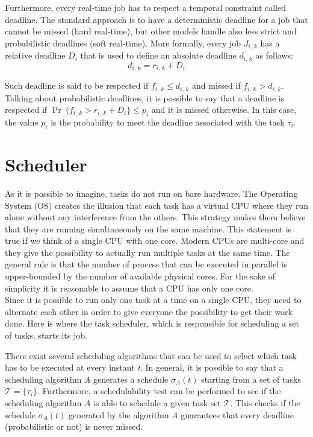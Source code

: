 Furthermore, every real-time job has to respect a temporal constraint called
deadline. The standard approach is to have a deterministic deadline for a job
that cannot be missed (hard real-time), but other models handle also
less strict and probabilistic deadlines (soft real-time).
More formally, every job \( J_{i,\,k} \) has a relative deadline \( D_{i} \) that
is used to define an absolute deadline \( d_{i,\,k} \) as follows:
\begin{equation}
    d_{i,\,k} = r_{i,\,k} + D_{i}
\end{equation}

Such deadline is said to be respected if \( f_{i,\,k} \leq d_{i,\,k} \) and missed
if \( f_{i,\,k} > d_{i,\,k} \). Talking about probabilistic deadlines, it is
possible to say that a deadline is respected if 
\( \Pr\,\{f_{i,\,k} > r_{i,\,k} + D_{i} \} \leq p_{i} \) and it is missed otherwise.
In this case, the value \( p_{i} \) is the probability to meet the deadline associated
with the task \( \tau_{i} \).

\section{Scheduler} \label{sec:scheduler}
As it is possible to imagine, tasks do not run on bare hardware.
The Operating System (OS) creates the illusion that each task has a virtual CPU
where they run alone without any interference from the others.
This strategy makes them believe that they are running simultaneously on the same
machine. This statement is true if we think of a single CPU with one core. Modern
CPUs are multi-core and they give the possibility to actually run multiple tasks
at the same time. The general rule is that the number of process that can be
executed in parallel is upper-bounded by the number of available physical cores.
For the sake of simplicity it is reasonable to assume that a CPU has only one core.\\
Since it is possible to run only one task at a time on a single CPU, they need
to alternate each other in order to give everyone the possibility to get their
work done. Here is where the task scheduler, which is responsible for
scheduling a set of tasks, starts its job.

There exist several scheduling algorithms that can be used to select which task 
has to be executed at every instant \emph{t}. In general, it is
possible to say that a scheduling algorithm \emph{A} generates a schedule
\( \sigma_{A}\left(t\right) \) starting from a set of tasks \( \mathcal{T} = \{\tau_{i}\} \).
Furthermore, a schedulability test can be performed to see if the scheduling
algorithm \( A \) is able to schedule a given task set \( \mathcal{T} \). This checks
if the schedule \( \sigma_{A}\left(t\right) \) generated by the algorithm \emph{A}
guarantees that every deadline (probabilistic or not) is never missed.

